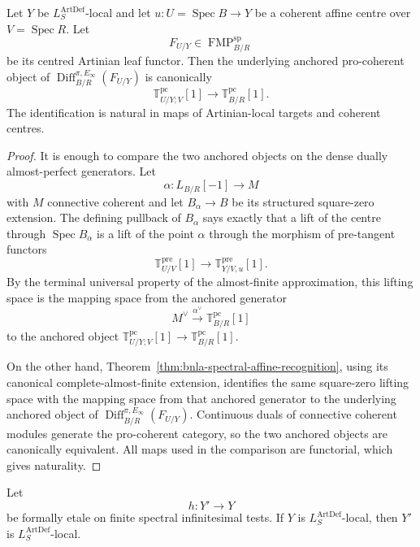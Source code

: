 \begin{theorem}
\label{thm:bnla-pre-tangent-leaf-controller}
Let $Y$ be $L_S^{\mathrm{ArtDef}}$-local and let
$u:U=\operatorname{Spec}B\to Y$ be a coherent affine centre over
$V=\operatorname{Spec}R$.  Let
\[
    F_{U/Y}\in\operatorname{FMP}^{\mathrm{sp}}_{B/R}
\]
be its centred Artinian leaf functor.  Then the underlying anchored
pro-coherent object of
$\operatorname{Diff}^{\pi,E_\infty}_{B/R}(F_{U/Y})$ is canonically
\[
\boxed{
    \mathbb T^{\mathrm{pc}}_{U/Y;V}[1]
    \longrightarrow
    \mathbb T^{\mathrm{pc}}_{B/R}[1].}
\]
The identification is natural in maps of Artinian-local targets and coherent
centres.
\end{theorem}

\begin{proof}
It is enough to compare the two anchored objects on the dense dually
almost-perfect generators.  Let
\[
    \alpha:L_{B/R}[-1]\longrightarrow M
\]
with $M$ connective coherent and let $B_\alpha\to B$ be its structured
square-zero extension.  The defining pullback of $B_\alpha$ says exactly that
a lift of the centre through $\operatorname{Spec}B_\alpha$ is a lift of the
point $\alpha$ through the morphism of pre-tangent functors
\[
    \mathbb T^{\mathrm{pre}}_{U/V}[1]
    \longrightarrow
    \mathbb T^{\mathrm{pre}}_{Y/V,u}[1].
\]
By the terminal universal property of the almost-finite approximation, this
lifting space is the mapping space from the anchored generator
\[
    M^\vee\xrightarrow{\alpha^\vee}
    \mathbb T^{\mathrm{pc}}_{B/R}[1]
\]
to the anchored object
$\mathbb T^{\mathrm{pc}}_{U/Y;V}[1]\to
\mathbb T^{\mathrm{pc}}_{B/R}[1]$.

On the other hand, Theorem~\ref{thm:bnla-spectral-affine-recognition}, using
its canonical complete-almost-finite extension, identifies the same
square-zero lifting space with the mapping space from that anchored generator
to the underlying anchored object of
$\operatorname{Diff}^{\pi,E_\infty}_{B/R}(F_{U/Y})$.  Continuous duals of
connective coherent modules generate the pro-coherent category, so the two
anchored objects are canonically equivalent.  All maps used in the
comparison are functorial, which gives naturality.
\end{proof}

\begin{lemma}
\label{lem:bnla-artdef-formal-etale-inheritance}
Let
\[
    h:Y'\longrightarrow Y
\]
be formally etale on finite spectral infinitesimal tests.  If $Y$ is
$L^{\mathrm{ArtDef}}_S$-local, then $Y'$ is
$L^{\mathrm{ArtDef}}_S$-local.
\end{lemma}

